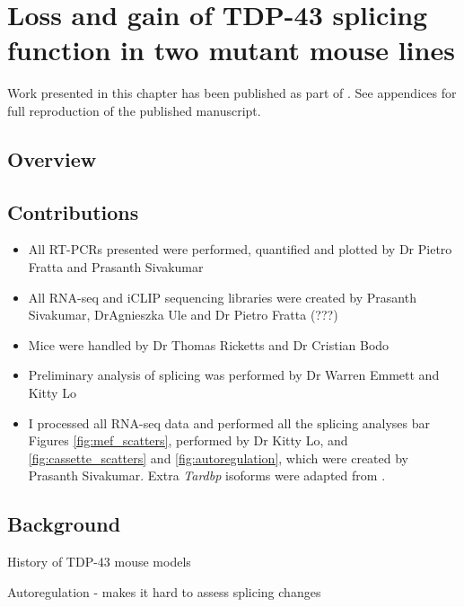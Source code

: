 \chapter{Loss and gain of TDP-43 splicing function in two mutant mouse lines}
\label{chapter:tdp_mice}

Work presented in this chapter has been published as part of \citep{Fratta2018}. See appendices for full reproduction of the published manuscript.

\section{Overview}


\section{Contributions}
\begin{itemize}
	\item All RT-PCRs presented were performed, quantified and plotted by Dr Pietro Fratta and Prasanth Sivakumar
	\item All RNA-seq and iCLIP sequencing libraries were created by Prasanth Sivakumar, DrAgnieszka Ule and Dr Pietro Fratta (???)
	\item Mice were handled by Dr Thomas Ricketts and Dr Cristian Bodo
	\item Preliminary analysis of splicing was performed by Dr Warren Emmett and Kitty Lo
	\item I processed all RNA-seq data and performed all the splicing analyses bar Figures \ref{fig:mef_scatters}, performed by Dr Kitty Lo, and  \ref{fig:cassette_scatters} and \ref{fig:autoregulation}, which were created by Prasanth Sivakumar. Extra \textit{Tardbp} isoforms were adapted from \cite{Koyama2016}.
\end{itemize}





\section{Background}

History of TDP-43 mouse models

Autoregulation - makes it hard to assess splicing changes

